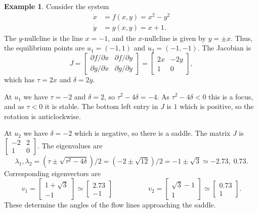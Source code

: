 \documentclass[reqno]{amsart}
\theoremstyle{definition}
\newtheorem{example}[theorem]{Example}
\begin{document}
\newpage

\begin{example}\label{eg-misc-d}
 Consider the system
 \begin{align*}
  \dot{x} &= f(x,y) = x^2-y^2 \\
  \dot{y} &= g(x,y) = x+1.
 \end{align*} 
 The $y$-nullcline is the line $x=-1$, and the $x$-nullcline is given
 by $y=\pm x$.  Thus, the equilibrium points are $u_1=(-1,1)$ and
 $u_2=(-1,-1)$.  The Jacobian is 
 \[ J = \left[\begin{array}{cc} \partial f/\partial x & \partial f/\partial y \\
             \partial g/\partial x & \partial g/\partial y \end{array}\right]
      = \left[\begin{array}{cc} 2x & -2y \\ 1 & 0 \end{array}\right],
 \]
 which has $\tau=2x$ and $\delta=2y$. 

 At $u_1$ we have $\tau=-2$ and $\delta=2$, so $\tau^2-4\delta=-4$.  As
 $\tau^2-4\delta<0$ this is a focus, and as $\tau<0$ it is stable.  The
 bottom left entry in $J$ is $1$ which is positive, so the rotation is
 anticlockwise.

 At $u_2$ we have $\delta=-2$ which is negative, so there is a saddle.
 The matrix $J$ is $\left[\begin{array}{cc} -2&2\\1 & 0\end{array}\right]$.  The eigenvalues are 
 \[ \lambda_1,\lambda_2 = (\tau\pm\sqrt{\tau^2-4\delta})/2 = 
     (-2\pm\sqrt{12})/2 = -1\pm\sqrt{3} \simeq -2.73,\;0.73.
 \]
 Corresponding eigenvectors are 
 \[ v_1 = \left[\begin{array}{cc} 1+\sqrt{3} \\ -1 \end{array}\right] \simeq \left[\begin{array}{cc} 2.73 \\ -1 \end{array}\right]
    \hspace{5em}
    v_2 = \left[\begin{array}{cc} \sqrt{3}-1 \\ 1 \end{array}\right] \simeq \left[\begin{array}{cc} 0.73 \\ 1 \end{array}\right].
 \]
 These determine the angles of the flow lines approaching the saddle.


\end{example}
\end{document}
